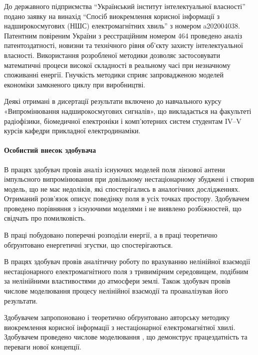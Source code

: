До державного підприємства ``Український інститут інтелектуальної 
власності'' подано заявку на винахід ``Спосіб виокремлення корисної інформації 
з надширокосмугових (НШС) електромагнітних хвиль'' з номером a202004038.
Патентним повіреним України з реєстраційним номером 464 проведено 
аналіз патентоздатності, новизни та технічного рівня об'єкту захисту 
інтелектуальної власності. Використання розробленої методики дозволяє 
застосовувати математичні процеси високої складності в реальному часі 
при незначному споживанні енергії. Гнучкість методики  сприяє 
запровадженою моделей економіки замкненого циклу при виробництві.

Деякі отримані в дисертації результати включено до навчального курсу 
«Випромінювання надширокосмугових сигналів», що викладається на 
факультеті радіофізики, біомедичної електроніки і комп’ютерних систем
студентам IV--V курсів кафедри прикладної електродинаміки.


\paragraph{Особистий внесок здобувача}

В працях \cite{my:Telecom2018, my:UKRCON2017, my:UKRCON2019} здобувач провів
аналіз існуючих моделей поля лінзової антени імпульсного випромінювання 
при довільному нестаціонарному збуджені і створив модель, що не має недоліків,
які спостерігались в аналогічних дослідженнях. Отриманий розв'язок описує 
поведінку поля в усіх точках простору. Здобувачем проведено порівняння з 
існуючими моделями і не виявлено розбіжностей, що свідчать про помилковість.

В праці \cite{my:Vesnik2017-2} побудовано поперечні розподіли енергії, а
в праці \cite{imp:Vesnik2018} теоретично обґрунтовано енергетичні згустки, 
що спостерігаються.

В працях \cite{my:Vesnik2015, my:Vesnik2017, my:Vesnik2017-2, my:MMET2014, 
my:UWBUSIS2014, my:ICATT2015, my:UWBUSIS2016, my:KPI2016, my:DIPED2019} 
здобувач провів аналітичну роботу по врахуванню нелінійної взаємодії 
нестаціонарного електромагнітного поля з тривимірним середовищем, 
подібним за нелінійними властивостями до атмосфери землі. Також здобувач
провів числове моделювання процесу нелінійної взаємодії та проаналізував 
його результати.

Здобувачем запропоновано \cite{my:UWBUSIS2018} і теоретично обґрунтовано
\cite{my:TKEA2020} авторську методику виокремлення корисної інформації 
з нестаціонарної електромагнітної хвилі. Здобувачем проведено числове 
моделювання \cite{my:a202004038}, що демонструє працездатність 
та переваги нової концепції.

